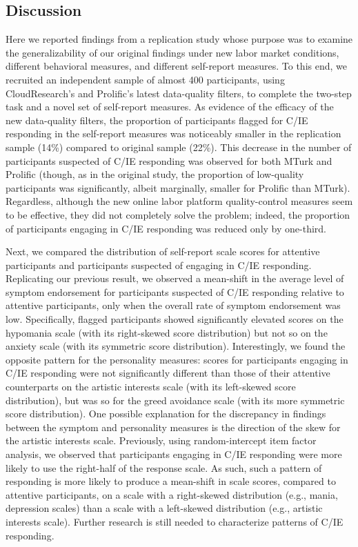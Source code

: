 \documentclass[a4paper,notitlepage,12pt]{article}
\begin{document}
\subsection*{Discussion}

Here we reported findings from a replication study whose purpose was to examine the generalizability of our original findings under new labor market conditions, different behavioral measures, and different self-report measures. To this end, we recruited an independent sample of almost 400 participants, using CloudResearch's and Prolific's latest data-quality filters, to complete the two-step task and a novel set of self-report measures. As evidence of the efficacy of the new data-quality filters, the proportion of participants flagged for C/IE responding in the self-report measures was noticeably smaller in the replication sample (14\%) compared to original sample (22\%). This decrease in the number of participants suspected of C/IE responding was observed for both MTurk and Prolific (though, as in the original study, the proportion of low-quality participants was significantly, albeit marginally, smaller for Prolific than MTurk). Regardless, although the new online labor platform quality-control measures seem to be effective, they did not completely solve the problem; indeed, the proportion of participants engaging in C/IE responding was reduced only by one-third.

Next, we compared the distribution of self-report scale scores for attentive participants and participants suspected of engaging in C/IE responding. Replicating our previous result, we observed a mean-shift in the average level of symptom endorsement for participants suspected of C/IE responding relative to attentive participants, only when the overall rate of symptom endorsement was low. Specifically, flagged participants showed significantly elevated scores on the hypomania scale (with its right-skewed score distribution) but not so on the anxiety scale (with its symmetric score distribution). Interestingly, we found the opposite pattern for the personality measures: scores for participants engaging in C/IE responding were not significantly different than those of their attentive counterparts on the artistic interests scale (with its left-skewed score distribution), but was so for the greed avoidance scale (with its more symmetric score distribution). One possible explanation for the discrepancy in findings between the symptom and personality measures is the direction of the skew for the artistic interests scale. Previously, using random-intercept item factor analysis, we observed that participants engaging in C/IE responding were more likely to use the right-half of the response scale. As such, such a pattern of responding is more likely to produce a mean-shift in scale scores, compared to attentive participants, on a scale with a right-skewed distribution (e.g., mania, depression scales) than a scale with a left-skewed distribution (e.g., artistic interests scale). Further research is still needed to characterize patterns of C/IE responding. 
\end{document}
